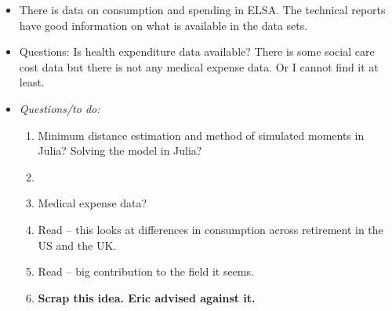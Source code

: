 \documentclass[12pt]{article}
\begin{document}
\begin{itemize}
      \item There is data on consumption and spending in ELSA. The technical
            reports have good information on what is available in the data sets.

      \item Questions: Is health expenditure data available? There is some
            social care cost data but there is not any medical expense data. Or
            I cannot find it at least.

      \item \textit{Questions/to do:}
            \begin{enumerate}
                  \item Minimum distance estimation and method of simulated
                        moments in Julia? Solving the model in Julia?
                  \item
                  \item Medical expense data?
                  \item Read \cite{banks_et_al_aej_2019} -- this looks at
                        differences in consumption across retirement in the US and the
                        UK.
                  \item Read \cite{gourinchas_parker_ec_2003} -- big
                        contribution to the field it seems.
                  \item \textbf{Scrap this idea. Eric advised against it.}
            \end{enumerate}


\end{itemize}
\end{document}
